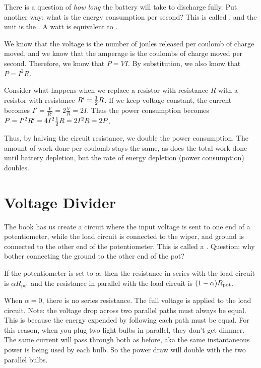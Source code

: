\documentclass[11pt, oneside]{amsart}
\begin{document}
There is a question of \emph{how long} the battery will take to
discharge fully. Put another way: what is the energy consumption per
second? This is called , and the unit is the
. A watt is equivalent to .

We know that the voltage is the number of joules released per coulomb of
charge moved, and we know that the amperage is the coulombs of charge
moved per second. Therefore, we know that $P=VI$. By substitution, we
also know that $P=I^2 R$.

Consider what happens when we replace a resistor with resistance $R$
with a resistor with resistance $R' = \frac{1}{2} R$. If we keep voltage
constant, the current becomes $I' = \frac{V}{R'} = 2 \frac{V}{R} = 2I$.
Thus the power consumption becomes $P = I'^2 R' = 4 I^2 \frac{1}{2} R = 2 I^2
R = 2P$.

Thus, by halving the circuit resistance, we double the power
consumption. The amount of work done per coulomb stays the same, as does
the total work done until battery depletion, but the rate of energy
depletion (power consumption) doubles.

\section{Voltage Divider}

\newcommand{\Rtot}{R_\text{total}}
\newcommand{\Rload}{R_\text{load}}
\newcommand{\Rpot}{R_\text{pot}}

The book has us create a circuit where the input voltage is sent to one
end of a potentiometer, while the load circuit is connected to the
wiper, and ground is connected to the other end of the potentiometer.
This is called a . Question: why bother
connecting the ground to the other end of the pot?


If the potentiometer is set to $\alpha$, then the resistance in series
with the load circuit is $\alpha \Rpot$ and the resistance in parallel
with the load circuit is $\parens{1 - \alpha} \Rpot$.

When $\alpha = 0$, there is no series resistance. The full voltage is
applied to the load circuit. Note: the voltage drop across two parallel
paths must always be equal. This is because the energy expended by
following each path must be equal. For this reason, when you plug two
light bulbs in parallel, they don't get dimmer. The same current will
pass through both as before, aka the same instantaneous power is being
used by each bulb. So the power draw will double with the two parallel
bulbs.
\end{document}
